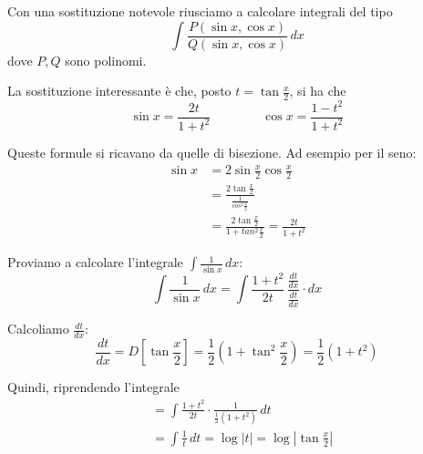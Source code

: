 \begin{example}
Con una sostituzione notevole riusciamo a calcolare integrali del tipo
\begin{equation*}
\int \frac{P(\sin x, \cos x)}{Q(\sin x, \cos x)} \, dx
\end{equation*}
dove $P, Q$ sono polinomi.

La sostituzione interessante è che, posto $t = \tan \frac{x}{2}$, si ha che
\begin{equation*}
\sin x = \frac{2t}{1+t^2} \qquad \qquad \cos x = \frac{1-t^2}{1+t^2}
\end{equation*}

Queste formule si ricavano da quelle di bisezione. Ad esempio per il seno:
\begin{align*}
\sin x &= 2 \sin \frac{x}{2} \cos \frac{x}{2} \\
&= \frac{2\tan \frac{x}{2}}{\frac{1}{cos^2 \frac{x}{2}}} \\
&= \frac{2\tan \frac{x}{2}}{1+tan^2 \frac{x}{2}} = \frac{2t}{1+t^2}
\end{align*}

Proviamo a calcolare l'integrale $\int \frac{1}{\sin x} \, dx$:
\begin{equation*}
\int \frac{1}{\sin x} \, dx = \int \frac{1+t^2}{2t} \, \frac{\frac{dt}{dx}}{\frac{dt}{dx}} \cdot dx
\end{equation*}

Calcoliamo $\frac{dt}{dx}$:
\begin{equation*}
\frac{dt}{dx} = D\left[\tan\frac{x}{2}\right] = \frac{1}{2} \left(1 + \tan^2\frac{x}{2} \right) = \frac{1}{2} (1+t^2)
\end{equation*}

Quindi, riprendendo l'integrale
\begin{align*}
&= \int \frac{1+t^2}{2t} \cdot \frac{1}{\frac{1}{2}(1+t^2)} \, dt \\
&= \int \frac{1}{t} \, dt = \log |t| = \log \left\lvert\tan \frac{x}{2}\right\rvert 
\end{align*}
\end{example}
